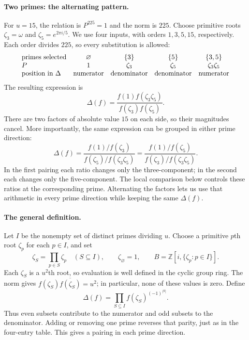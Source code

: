 \documentclass[11pt]{article}
\begin{document}
\paragraph{Two primes: the alternating pattern.}
For $u=15$, the relation is $P^{225}=1$ and the norm is $225$.
Choose primitive roots $\zeta_3=\omega$ and $\zeta_5=e^{2\pi i/5}$.
We use four inputs, with orders $1,3,5,15$, respectively. Each order
divides $225$, so every substitution is allowed:
\[
 \begin{array}{l@{\quad}cccc}
 \text{primes selected} & \varnothing & \{3\} & \{5\} & \{3,5\} \\
 P & 1 & \zeta_3 & \zeta_5 & \zeta_3\zeta_5 \\
 \text{position in }\Delta & \text{numerator} & \text{denominator}
   & \text{denominator} & \text{numerator}
 \end{array}
\]
The resulting expression is
\begin{equation}
 \Delta(f)=\frac{f(1)f(\zeta_3\zeta_5)}{f(\zeta_3)f(\zeta_5)}.%
 \label{eq:delta-fifteen}
\end{equation}
There are two factors of absolute value $15$ on each side, so their
magnitudes cancel. More importantly, the same expression can be grouped
in either prime direction:
\begin{equation}
 \Delta(f)
 =\frac{f(1)/f(\zeta_3)}{f(\zeta_5)/f(\zeta_3\zeta_5)}
 =\frac{f(1)/f(\zeta_5)}{f(\zeta_3)/f(\zeta_3\zeta_5)}.%
 \label{eq:delta-fifteen-pairings}
\end{equation}
In the first pairing each ratio changes only the three-component;
in the second each changes only the five-component. The local comparison
below controls these ratios at the corresponding prime. Alternating the
factors lets us use that arithmetic in every prime direction while
keeping the same $\Delta(f)$.

\paragraph{The general definition.}
Let $I$ be the nonempty set of distinct primes dividing $u$. Choose a
primitive $p$th root $\zeta_{p}$ for each $p\in I$, and set
\[
 \zeta_{S}=\prod_{p\in S}\zeta_{p}\quad(S\subseteq I),\qquad
 \zeta_\varnothing=1,\qquad
 B=\mathbb Z[i,\{\zeta_{p}:p\in I\}].
\]
Each $\zeta_{S}$ is a $u^{2}$th root, so evaluation is well defined in the
cyclic group ring. The norm gives
$f(\zeta_{S})\overline{f(\zeta_{S})}=u^{2}$; in particular, none of these
values is zero. Define
\begin{equation}
 \Delta(f)=\prod_{S\subseteq I}{f(\zeta_{S})}^{{(-1)}^{|S|}}.%
 \label{eq:late-delta}
\end{equation}
Thus even subsets contribute to the numerator and odd subsets to the
denominator. Adding or removing one prime reverses that parity, just as
in the four-entry table. This gives a pairing in each prime direction.
\end{document}
